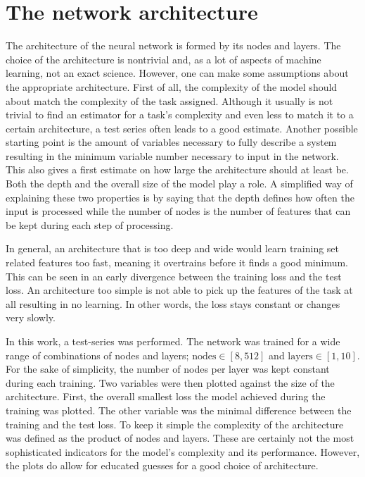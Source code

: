 \section{The network architecture}

The architecture of the neural network is formed by its nodes and layers. The choice of the architecture is nontrivial and, as a lot of aspects of machine learning, not an exact science.
However, one can make some assumptions about the appropriate architecture.
First of all, the complexity of the model should about match the complexity of the task assigned. Although it usually is not trivial to find an estimator for a task's complexity and even less to match it to a certain architecture, a test series often leads to a good estimate. Another possible starting point is the amount of variables necessary to fully describe a system resulting in the minimum variable number necessary to input in the network. This also gives a first estimate on how large the architecture should at least be.
Both the depth and the overall size of the model play a role. A simplified way of explaining these two properties is by saying that the depth defines how often the input is processed while the number of nodes is the number of features that can be kept during each step of processing.

In general, an architecture that is too deep and wide would learn training set related features too fast, meaning it overtrains before it finds a good minimum. This can be seen in an early divergence between the training loss and the test loss. An architecture too simple is not able to pick up the features of the task at all resulting in no learning. In other words, the loss stays constant or changes very slowly.

In this work, a test-series was performed. The network was trained for a wide range of combinations of nodes and layers; $\text{nodes}\in[8,512]$ and $\text{layers}\in[1,10]$. For the sake of simplicity, the number of nodes per layer was kept constant during each training. Two variables were then plotted against the size of the architecture. First, the overall smallest loss the model achieved during the training was plotted. The other variable was the minimal difference between the training and the test loss. To keep it simple the complexity of the architecture was defined as the product of nodes and layers. These are certainly not the most sophisticated indicators for the model's complexity and its performance. However, the plots do allow for educated guesses for a good choice of architecture.

